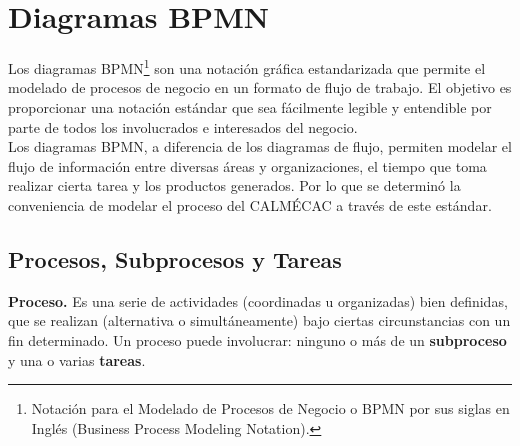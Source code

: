 %
%

\chapter{Diagramas BPMN}
\label{chapter:bpmn}

	Los diagramas BPMN\footnote{Notación para el Modelado de Procesos de Negocio o BPMN por sus siglas en Inglés (Business Process Modeling Notation).} son una notación gráfica estandarizada que permite el modelado de procesos de negocio en un formato de flujo de trabajo. El objetivo es proporcionar una notación estándar que sea fácilmente legible y entendible por parte de todos los involucrados e interesados del negocio.\\

	Los diagramas BPMN, a diferencia de los diagramas de flujo, permiten modelar el flujo de información entre diversas áreas y organizaciones, el tiempo que toma realizar cierta tarea y los productos generados. Por lo que se determinó la conveniencia de modelar el proceso del CALMÉCAC a través de este estándar.


\section{Procesos, Subprocesos y Tareas}

{\bf Proceso.} Es una serie de actividades (coordinadas u organizadas) bien definidas, que se realizan (alternativa o simultáneamente) bajo ciertas circunstancias con un fin determinado. Un proceso puede involucrar: ninguno o más de un {\bf subproceso} y una o varias {\bf tareas}.\\

